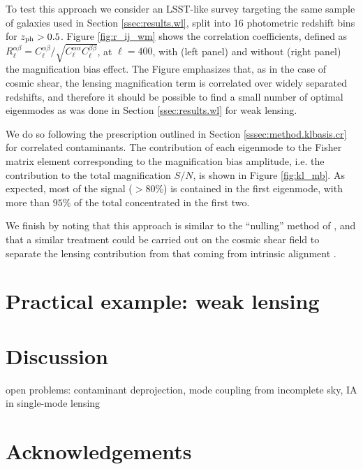 \documentclass[twocolumn,amsfont,amssymb,amsmath, showpacs,balancelastpage, nofootinbib]{revtex4-1}
\begin{document}
    To test this approach we consider an LSST-like survey targeting the same sample of galaxies used in Section \ref{ssec:results.wl}, split into 16 photometric redshift bins for $z_{\rm ph}>0.5$. Figure \ref{fig:r_ij_wm} shows the correlation coefficients, defined as $R^{\alpha\beta}_\ell=C^{\alpha\beta}_\ell/\sqrt{C^{\alpha\alpha}_\ell C^{\beta\beta}_\ell}$, at $\ell=400$, with (left panel) and without (right panel) the magnification bias effect. The Figure emphasizes that, as in the case of cosmic shear, the lensing magnification term is correlated over widely separated redshifts, and therefore it should be possible to find a small number of optimal eigenmodes as was done in Section \ref{ssec:results.wl} for weak lensing.
    
    We do so following the prescription outlined in Section \ref{sssec:method.klbasis.cr} for correlated contaminants. The contribution of each eigenmode to the Fisher matrix element corresponding to the magnification bias amplitude, i.e. the contribution to the total magnification $S/N$, is shown in Figure \ref{fig:kl_mb}. As expected, most of the signal ($>80\%$) is contained in the first eigenmode, with more than $95\%$ of the total concentrated in the first two.
    
    We finish by noting that this approach is similar to the ``nulling'' method of \cite{2011MNRAS.415.1681H}, and that a similar treatment could be carried out on the cosmic shear field to separate the lensing contribution from that coming from intrinsic alignment \cite{2008A&A...488..829J}.

    
\section{Practical example: weak lensing}
  \lipsum[2]

\section{Discussion}\label{sec:discussion}
  \lipsum[3]
  
  open problems: contaminant deprojection, mode coupling from incomplete sky, IA in single-mode lensing
  
  
\section*{Acknowledgements}
  \lipsum[4]
  

\end{document}
